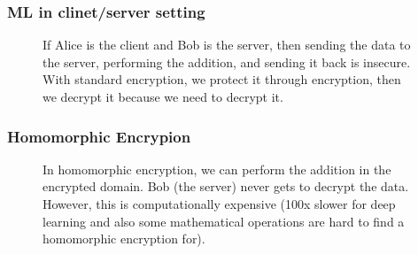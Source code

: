 \documentclass[11pt]{article}
\begin{document}


\subsubsection{ML in clinet/server setting}

\begin{figure}[H]
    \centering
    \caption{If Alice is the client and Bob is the server, then sending the data to the server, performing the addition, and sending it back is insecure. With standard encryption, we protect it through encryption, then we decrypt it because we need to decrypt it.}
\end{figure}

\subsubsection{Homomorphic Encrypion}

\begin{figure}[H]
    \centering
    \caption{In homomorphic encryption, we can perform the addition in the encrypted domain. Bob (the server) never gets to decrypt the data. However, this is computationally expensive (100x slower for deep learning and also some mathematical operations are hard to find a homomorphic encryption for).}
\end{figure}


\end{document}

